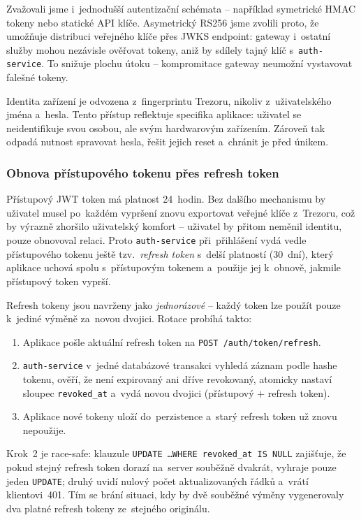 Zvažovali jsme i~jednodušší autentizační schémata -- například symetrické
HMAC tokeny nebo statické API klíče. Asymetrický RS256 jsme zvolili proto,
že umožňuje distribuci veřejného klíče přes JWKS endpoint: gateway i~ostatní
služby mohou nezávisle ověřovat tokeny, aniž by sdílely tajný klíč
s~\texttt{auth-service}. To snižuje plochu útoku -- kompromitace gateway
neumožní vystavovat falešné tokeny.

Identita zařízení je odvozena z~fingerprintu Trezoru, nikoliv z~uživatelského
jména a~hesla. Tento přístup reflektuje specifika aplikace: uživatel
se neidentifikuje svou osobou, ale svým hardwarovým zařízením. Zároveň
tak odpadá nutnost spravovat hesla, řešit jejich reset a~chránit je
před únikem.

\subsubsection{Obnova přístupového tokenu přes refresh token}
\label{subsec:refresh-token}

Přístupový JWT token má platnost 24~hodin. Bez dalšího mechanismu by
uživatel musel po~každém vypršení znovu exportovat veřejné klíče
z~Trezoru, což by výrazně zhoršilo uživatelský komfort -- uživatel
by přitom neměnil identitu, pouze obnovoval relaci. Proto \texttt{auth-service}
při~přihlášení vydá vedle přístupového tokenu ještě tzv.~\emph{refresh
token} s~delší platností (30~dní), který aplikace uchová spolu
s~přístupovým tokenem a~použije jej k~obnově, jakmile přístupový token
vyprší.

Refresh tokeny jsou navrženy jako \emph{jednorázové} -- každý token
lze použít pouze k~jediné výměně za~novou dvojici. Rotace probíhá takto:

\begin{enumerate}
\item Aplikace pošle aktuální refresh token na \texttt{POST /auth/token/refresh}.
\item \texttt{auth-service} v~jedné databázové transakci vyhledá záznam
  podle hashe tokenu, ověří, že není expirovaný ani dříve revokovaný,
  atomicky nastaví sloupec \texttt{revoked\_at} a~vydá novou dvojici
  (přístupový $+$ refresh token).
\item Aplikace nové tokeny uloží do~perzistence a~starý refresh token
  už znovu nepoužije.
\end{enumerate}

Krok~2 je race-safe: klauzule \texttt{UPDATE \ldots WHERE revoked\_at
IS NULL} zajišťuje, že pokud stejný refresh token dorazí na~server
souběžně dvakrát, vyhraje pouze jeden \texttt{UPDATE}; druhý uvidí
nulový počet aktualizovaných řádků a~vrátí klientovi~401. Tím se brání
situaci, kdy by dvě souběžné výměny vygenerovaly dva platné refresh
tokeny ze~stejného originálu.

